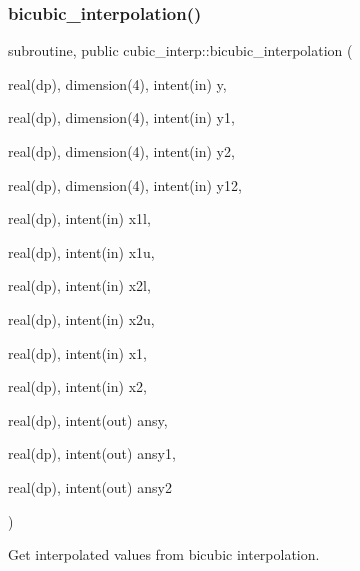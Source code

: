 \subsubsection{\texorpdfstring{bicubic\+\_\+interpolation()}{bicubic\_interpolation()}}
{\footnotesize\ttfamily subroutine, public cubic\+\_\+interp\+::bicubic\+\_\+interpolation (\begin{DoxyParamCaption}\item[{real(dp), dimension(4), intent(in)}]{y,  }\item[{real(dp), dimension(4), intent(in)}]{y1,  }\item[{real(dp), dimension(4), intent(in)}]{y2,  }\item[{real(dp), dimension(4), intent(in)}]{y12,  }\item[{real(dp), intent(in)}]{x1l,  }\item[{real(dp), intent(in)}]{x1u,  }\item[{real(dp), intent(in)}]{x2l,  }\item[{real(dp), intent(in)}]{x2u,  }\item[{real(dp), intent(in)}]{x1,  }\item[{real(dp), intent(in)}]{x2,  }\item[{real(dp), intent(out)}]{ansy,  }\item[{real(dp), intent(out)}]{ansy1,  }\item[{real(dp), intent(out)}]{ansy2 }\end{DoxyParamCaption})}



Get interpolated values from bicubic interpolation. 

